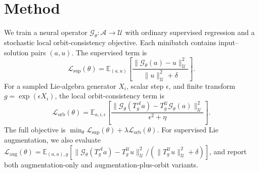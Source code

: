 \section{Method}
\label{sec:method}

We train a neural operator \(\mathcal G_\theta:\mathcal A\to\mathcal U\) with ordinary supervised regression and a stochastic local orbit-consistency objective. Each minibatch contains input--solution pairs \((a,u)\). The supervised term is
\begin{equation}
\mathcal L_{\mathrm{sup}}(\theta)=\mathbb E_{(a,u)}\left[\frac{\|\mathcal G_\theta(a)-u\|_{\mathcal U}^2}{\|u\|_{\mathcal U}^2+\delta}\right].
\end{equation}
For a sampled Lie-algebra generator \(X_i\), scalar step \(\epsilon\), and finite transform \(g=\exp(\epsilon X_i)\), the local orbit-consistency term is
\begin{equation}
\mathcal L_{\mathrm{orb}}(\theta)=\mathbb E_{a,i,\epsilon}\left[\frac{\|\mathcal G_\theta(T_g^{\mathcal A}a)-T_g^{\mathcal U}\mathcal G_\theta(a)\|_{\mathcal U}^2}{\epsilon^2+\eta}\right].
\end{equation}
The full objective is \(\min_\theta \mathcal L_{\mathrm{sup}}(\theta)+\lambda\mathcal L_{\mathrm{orb}}(\theta)\). For supervised Lie augmentation, we also evaluate \(\mathcal L_{\mathrm{aug}}(\theta)=\mathbb E_{(a,u),g}[\|\mathcal G_\theta(T_g^{\mathcal A}a)-T_g^{\mathcal U}u\|_{\mathcal U}^2/(\|T_g^{\mathcal U}u\|_{\mathcal U}^2+\delta)]\), and report both augmentation-only and augmentation-plus-orbit variants.

